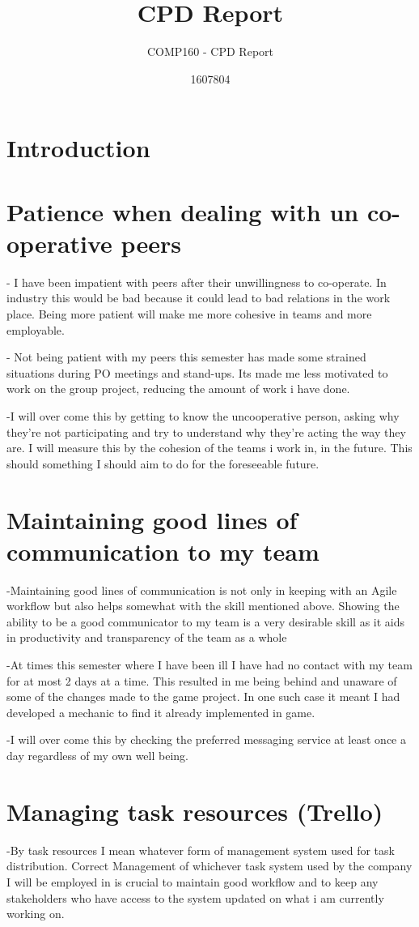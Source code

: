 \documentclass{scrartcl}
\title{CPD Report}
\subtitle{COMP160 - CPD Report}
\author{1607804}
\begin{document}
\maketitle

\section{Introduction}


\section{Patience when dealing with un co-operative peers}
- I have been impatient with peers after their unwillingness to co-operate. In industry this would be bad because it could lead to bad relations in the work place. Being more patient will make me more cohesive in teams and more employable.

- Not being patient with my peers this semester has made some strained situations during PO meetings and stand-ups. Its made me less motivated to work on the group project, reducing the amount of work i have done.

-I will over come this by getting to know the uncooperative person, asking why they're not participating and try to understand why they're acting the way they are. I will measure this by the cohesion of the teams i work in, in the future. This should something I should aim to do for the foreseeable future. 

\section{Maintaining good lines of communication to my team}
-Maintaining good lines of communication is not only in keeping with an Agile workflow but also helps somewhat with the skill mentioned above. Showing the ability to be a good communicator to my team is a very desirable skill as it aids in productivity and transparency of the team as a whole

-At times this semester where I have been ill I have had no contact with my team for at most 2 days at a time. This resulted in me being behind and unaware of some of the changes made to the game project. In one such case it meant I had developed a mechanic to find it already implemented in game.

-I will over come this by checking the preferred messaging service at least once a day regardless of my own well being. 


\section{Managing task resources (Trello)}
-By task resources I mean whatever form of management system used for task distribution. Correct Management of whichever task system used by the company I will be employed in is crucial to maintain good workflow and to keep any stakeholders who have access to the system updated on what i am currently working on.
\end{document}
